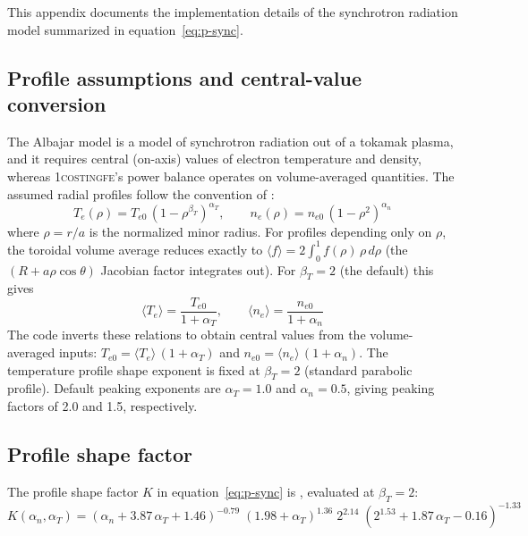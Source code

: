 \documentclass{article}
\begin{document}
This appendix documents the implementation details of the synchrotron
radiation model summarized in equation~\eqref{eq:p-sync}.

\subsection{Profile assumptions and central-value conversion}

The Albajar model is a model of synchrotron radiation out of a tokamak
plasma, and it requires central (on-axis) values of electron
temperature and density, whereas \textsc{1costingfe}'s power balance
operates on volume-averaged quantities. The assumed radial profiles
follow the convention of \citet{albajar2001}:
%
\begin{equation}
\label{eq:profile-Te}
T_e(\rho) = T_{e0}\,(1 - \rho^{\beta_T})^{\alpha_T}, \qquad
n_e(\rho) = n_{e0}\,(1 - \rho^{2})^{\alpha_n}
\end{equation}
%
where $\rho = r/a$ is the normalized minor radius. For profiles
depending only on $\rho$, the toroidal volume average reduces exactly
to $\langle f \rangle = 2\int_0^1 f(\rho)\,\rho\,d\rho$ (the
$(R + a\rho\cos\theta)$ Jacobian factor integrates out). For
$\beta_T = 2$ (the default) this gives
%
\begin{equation}
\label{eq:peaking}
\langle T_e \rangle = \frac{T_{e0}}{1 + \alpha_T}, \qquad
\langle n_e \rangle = \frac{n_{e0}}{1 + \alpha_n}
\end{equation}
%
The code inverts these relations to obtain central values from the
volume-averaged inputs: $T_{e0} = \langle T_e \rangle\,(1+\alpha_T)$
and $n_{e0} = \langle n_e \rangle\,(1+\alpha_n)$. The temperature
profile shape exponent is fixed at $\beta_T = 2$ (standard parabolic
profile). Default peaking exponents are $\alpha_T = 1.0$ and
$\alpha_n = 0.5$, giving peaking factors of 2.0 and 1.5, respectively.

\subsection{Profile shape factor}

The profile shape factor $K$ in equation~\eqref{eq:p-sync} is
\citep{albajar2001}, evaluated at $\beta_T = 2$:
%
\begin{equation}
\label{eq:K-factor}
K(\alpha_n, \alpha_T) =
  (\alpha_n + 3.87\,\alpha_T + 1.46)^{-0.79}\;
  (1.98 + \alpha_T)^{1.36}\;
  2^{2.14}\;
  (2^{1.53} + 1.87\,\alpha_T - 0.16)^{-1.33}
\end{equation}
\end{document}
